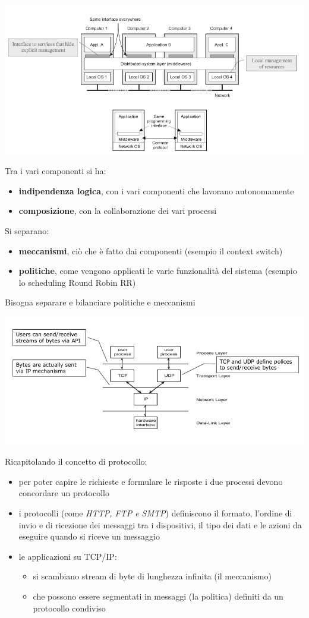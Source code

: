 \documentclass[a4paper,12pt, oneside]{book}
\begin{document}
\begin{center}
	\includegraphics[scale=2]{img/cli4.png}
\end{center}
Tra i vari componenti si ha:
\begin{itemize}
	\item \textbf{indipendenza logica}, con i vari componenti che lavorano autonomamente
	\item \textbf{composizione}, con la collaborazione dei vari processi
\end{itemize}
Si separano:
\begin{itemize}
	\item \textbf{meccanismi}, ciò che è fatto dai componenti (esempio il context switch)
	\item \textbf{politiche}, come vengono applicati le varie funzionalità del sistema (esempio lo scheduling Round Robin RR)
\end{itemize}
Bisogna separare e bilanciare politiche e meccanismi
\begin{center}
	\includegraphics[scale=2]{img/cli5.png}
\end{center}
Ricapitolando il concetto di protocollo:
\begin{itemize}
	\item per poter capire le richieste e formulare le risposte i due processi devono concordare un protocollo
	\item i protocolli (come \textit{HTTP, FTP e SMTP}) definiscono il formato, l'ordine di invio e di ricezione dei messaggi tra i dispositivi, il tipo dei dati e le azioni da eseguire quando si riceve un messaggio
	\item le applicazioni su TCP/IP:
	      \begin{itemize}
		      \item si scambiano stream di byte di lunghezza infinita (il meccanismo)
		      \item che possono essere segmentati in messaggi (la politica) definiti da un protocollo condiviso
	      \end{itemize}
\end{itemize}
\end{document}
